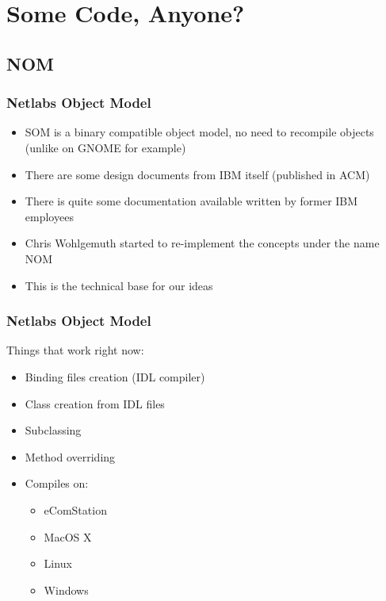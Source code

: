 \documentclass{beamer}
\begin{document}
\section{Some Code, Anyone?}
\subsection{NOM}

\begin{frame}
\frametitle{Netlabs Object Model}
\begin{itemize}
  \item SOM is a binary compatible object model, no need to recompile objects (unlike on GNOME for example)
  \item There are some design documents from IBM itself (published in ACM)
  \item There is quite some documentation available written by former IBM employees
  \item Chris Wohlgemuth started to re-implement the concepts under the name NOM
  \item This is the technical base for our ideas
\end{itemize}
\end{frame}

\begin{frame}
\frametitle{Netlabs Object Model}
Things that work right now:
\begin{itemize}
  \item Binding files creation (IDL compiler)
  \item Class creation from IDL files
  \item Subclassing
  \item Method overriding
  \item Compiles on:
  \begin{itemize}
    \item eComStation
    \item MacOS X
    \item Linux
    \item Windows
  \end{itemize}
\end{itemize}
\end{frame}
\end{document}
